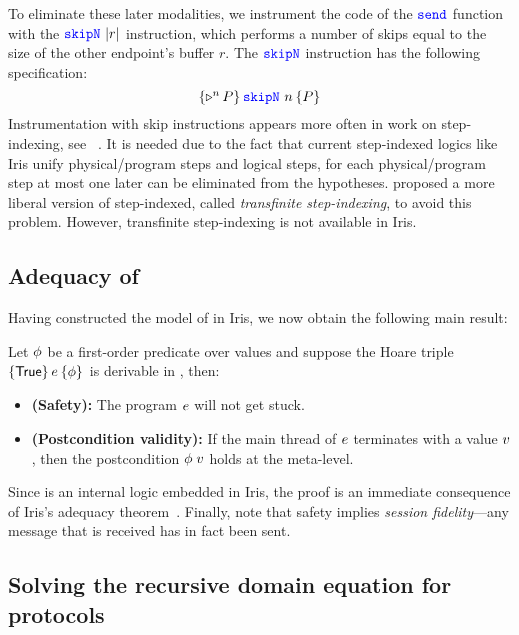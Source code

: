 To eliminate these later modalities, we instrument the code of the $\texttt{\color{blue} send}$
function with the $\texttt{\color{blue} skipN}\ \vert r\vert$ instruction, which performs a number
of skips equal to the size of the other endpoint's buffer $r$.
The $\texttt{\color{blue} skipN}$ instruction has the following specification:
\[
  \textstyle\hoare{\later^{n}\iprop}{\skipn\ n}{\iprop}
\]
Instrumentation with skip instructions appears more often in work on step-indexing,
see \eg~\cite{DBLP:conf/esop/SvendsenSB16,giarrusso-ICFP2020}.
It is needed due to the fact that current step-indexed logics like Iris
unify physical/program steps and logical steps, \ie for
each physical/program step at most one later can be eliminated from the hypotheses.
\citet{DBLP:conf/esop/SvendsenSB16} proposed a more liberal version of
step-indexed, called \emph{transfinite step-indexing}, to avoid this problem.
However, transfinite step-indexing is not available in Iris.

\subsection{Adequacy of \lname}
\label{sec:adequacy}

Having constructed the model of \lname in Iris, we now obtain the following main result:
\begin{theorem}
\label{thm:adequacy}
Let $\phi$ be a first-order predicate over values and suppose the Hoare
triple $\hoare \TRUE \expr \pprop$ is derivable in \lname, then:
\begin{itemize}
\item \textbf{(Safety):} The program $e$ will not get stuck.
\item \textbf{(Postcondition validity):} If the main thread of $e$
  terminates with a value $v$, then the postcondition $\phi\;v$ holds
  at the meta-level.
\end{itemize}
\end{theorem}
Since \lname is an internal logic embedded in Iris, the proof is an immediate
consequence of Iris's adequacy theorem~\cite{krebbers-ESOP2017,jung-JFP2018}.
Finally, note that safety implies \emph{session fidelity}---any message that
is received has in fact been sent.

\subsection{Solving the recursive domain equation for protocols}
\label{sec:equation_solution}

